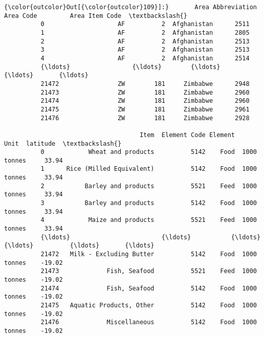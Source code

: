 \documentclass[11pt]{article}
\begin{document}
\begin{Verbatim}[commandchars=\\\{\}]
{\color{outcolor}Out[{\color{outcolor}109}]:}       Area Abbreviation  Area Code         Area Item Code  \textbackslash{}
          0                    AF          2  Afghanistan      2511   
          1                    AF          2  Afghanistan      2805   
          2                    AF          2  Afghanistan      2513   
          3                    AF          2  Afghanistan      2513   
          4                    AF          2  Afghanistan      2514   
          {\ldots}                 {\ldots}        {\ldots}          {\ldots}       {\ldots}   
          21472                ZW        181     Zimbabwe      2948   
          21473                ZW        181     Zimbabwe      2960   
          21474                ZW        181     Zimbabwe      2960   
          21475                ZW        181     Zimbabwe      2961   
          21476                ZW        181     Zimbabwe      2928   
          
                                     Item  Element Code Element         Unit  latitude  \textbackslash{}
          0            Wheat and products          5142    Food  1000 tonnes     33.94   
          1      Rice (Milled Equivalent)          5142    Food  1000 tonnes     33.94   
          2           Barley and products          5521    Feed  1000 tonnes     33.94   
          3           Barley and products          5142    Food  1000 tonnes     33.94   
          4            Maize and products          5521    Feed  1000 tonnes     33.94   
          {\ldots}                         {\ldots}           {\ldots}     {\ldots}          {\ldots}       {\ldots}   
          21472   Milk - Excluding Butter          5142    Food  1000 tonnes    -19.02   
          21473             Fish, Seafood          5521    Feed  1000 tonnes    -19.02   
          21474             Fish, Seafood          5142    Food  1000 tonnes    -19.02   
          21475   Aquatic Products, Other          5142    Food  1000 tonnes    -19.02   
          21476             Miscellaneous          5142    Food  1000 tonnes    -19.02   
          

\end{Verbatim}
\end{document}
